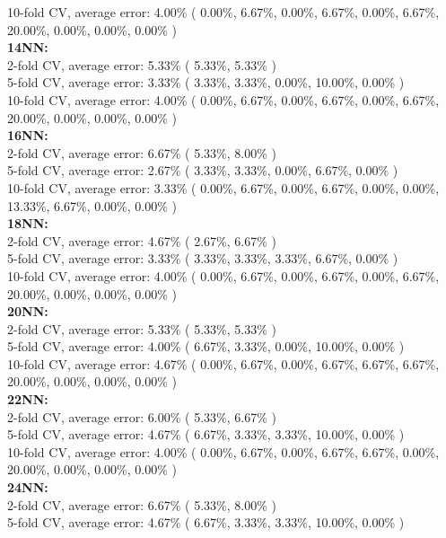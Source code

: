 \documentclass[11pt,a4paper]{article}
\begin{document}
10-fold CV, average error: 4.00\%  ( 0.00\%, 6.67\%, 0.00\%, 6.67\%, 0.00\%, 6.67\%, 20.00\%, 0.00\%, 0.00\%, 0.00\% )\\
\textbf{14NN:} \\
2-fold CV, average error: 5.33\%  ( 5.33\%, 5.33\% )\\
5-fold CV, average error: 3.33\%  ( 3.33\%, 3.33\%, 0.00\%, 10.00\%, 0.00\% )\\
10-fold CV, average error: 4.00\%  ( 0.00\%, 6.67\%, 0.00\%, 6.67\%, 0.00\%, 6.67\%, 20.00\%, 0.00\%, 0.00\%, 0.00\% )\\
\textbf{16NN:} \\
2-fold CV, average error: 6.67\%  ( 5.33\%, 8.00\% )\\
5-fold CV, average error: 2.67\%  ( 3.33\%, 3.33\%, 0.00\%, 6.67\%, 0.00\% )\\
10-fold CV, average error: 3.33\%  ( 0.00\%, 6.67\%, 0.00\%, 6.67\%, 0.00\%, 0.00\%, 13.33\%, 6.67\%, 0.00\%, 0.00\% )\\
\textbf{18NN:} \\
2-fold CV, average error: 4.67\%  ( 2.67\%, 6.67\% )\\
5-fold CV, average error: 3.33\%  ( 3.33\%, 3.33\%, 3.33\%, 6.67\%, 0.00\% )\\
10-fold CV, average error: 4.00\%  ( 0.00\%, 6.67\%, 0.00\%, 6.67\%, 0.00\%, 6.67\%, 20.00\%, 0.00\%, 0.00\%, 0.00\% )\\
\textbf{20NN:} \\
2-fold CV, average error: 5.33\%  ( 5.33\%, 5.33\% )\\
5-fold CV, average error: 4.00\%  ( 6.67\%, 3.33\%, 0.00\%, 10.00\%, 0.00\% )\\
10-fold CV, average error: 4.67\%  ( 0.00\%, 6.67\%, 0.00\%, 6.67\%, 6.67\%, 6.67\%, 20.00\%, 0.00\%, 0.00\%, 0.00\% )\\
\textbf{22NN:} \\
2-fold CV, average error: 6.00\%  ( 5.33\%, 6.67\% )\\
5-fold CV, average error: 4.67\%  ( 6.67\%, 3.33\%, 3.33\%, 10.00\%, 0.00\% )\\
10-fold CV, average error: 4.00\%  ( 0.00\%, 6.67\%, 0.00\%, 6.67\%, 6.67\%, 0.00\%, 20.00\%, 0.00\%, 0.00\%, 0.00\% )\\
\textbf{24NN:} \\
2-fold CV, average error: 6.67\%  ( 5.33\%, 8.00\% )\\
5-fold CV, average error: 4.67\%  ( 6.67\%, 3.33\%, 3.33\%, 10.00\%, 0.00\% )\\
\end{document}
